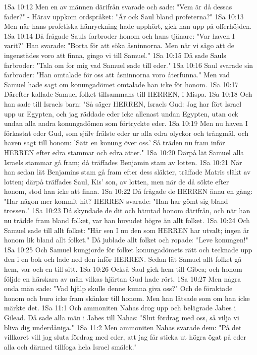 1Sa 10:12  Men en av männen därifrån svarade och sade: "Vem är då dessas fader?" - Härav uppkom ordspråket: "Är ock Saul bland profeterna?"
1Sa 10:13  Men när hans profetiska hänryckning hade upphört, gick han upp på offerhöjden.
1Sa 10:14  Då frågade Sauls farbroder honom och hans tjänare: "Var haven I varit?" Han svarade: "Borta för att söka åsninnorna. Men när vi sågo att de ingenstädes voro att finna, gingo vi till Samuel."
1Sa 10:15  Då sade Sauls farbroder: "Tala om for mig vad Samuel sade till eder."
1Sa 10:16  Saul svarade sin farbroder: "Han omtalade för oss att åsninnorna voro återfunna." Men vad Samuel hade sagt om konungadömet omtalade han icke för honom.
1Sa 10:17  Därefter kallade Samuel folket tillsammans till HERREN, i Mispa.
1Sa 10:18  Och han sade till Israels barn: "Så säger HERREN, Israels Gud: Jag har fört Israel upp ur Egypten, och jag räddade eder icke allenast undan Egypten, utan ock undan alla andra konungadömen som förtryckte eder.
1Sa 10:19  Men nu haven I förkastat eder Gud, som själv frälste eder ur alla edra olyckor och trångmål, och haven sagt till honom: 'Sätt en konung över oss.' Så träden nu fram inför HERREN efter edra stammar och edra ätter."
1Sa 10:20  Därpå lät Samuel alla Israels stammar gå fram; då träffades Benjamin stam av lotten.
1Sa 10:21  När han sedan lät Benjamins stam gå fram efter dess släkter, träffade Matris släkt av lotten; därpå träffades Saul, Kis' son, av lotten, men när de då sökte efter honom, stod han icke att finna.
1Sa 10:22  Då frågade de HERREN ännu en gång: "Har någon mer kommit hit? HERREN svarade: "Han har gömt sig bland trossen."
1Sa 10:23  Då skyndade de dit och hämtad honom därifrån, och när han nu trädde fram bland folket, var han huvudet högre än allt folket.
1Sa 10:24  Och Samuel sade till allt folket: "Här sen I nu den som HERREN har utvalt; ingen är honom lik bland allt folket." Då jublade allt folket och ropade: "Leve konungen!"
1Sa 10:25  Och Samuel kungjorde för folket konungadömets rätt och tecknade upp den i en bok och lade ned den inför HERREN. Sedan lät Samuel allt folket gå hem, var och en till sitt.
1Sa 10:26  Också Saul gick hem till Gibea; och honom följde en härskara av män vilkas hjärtan Gud hade rört.
1Sa 10:27  Men några onda män sade: "Vad hjälp skulle denne kunna giva oss?" Och de föraktade honom och buro icke fram skänker till honom. Men han låtsade som om han icke märkte det.
1Sa 11:1  Och ammoniten Nahas drog upp och belägrade Jabes i Gilead. Då sade alla män i Jabes till Nahas: "Slut fördrag med oss, så vilja vi bliva dig underdåniga."
1Sa 11:2  Men ammoniten Nahas svarade dem: "På det villkoret vill jag sluta fördrag med eder, att jag får sticka ut högra ögat på eder alla och därmed tillfoga hela Israel smälek."
